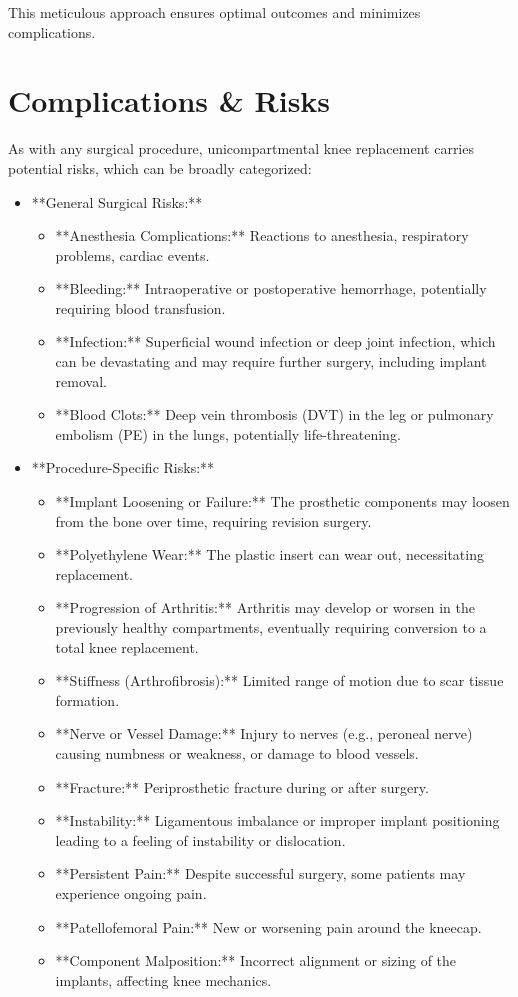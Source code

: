 This meticulous approach ensures optimal outcomes and minimizes complications.

\section*{Complications \& Risks}
As with any surgical procedure, unicompartmental knee replacement carries potential risks, which can be broadly categorized:

\begin{itemize}
  \item **General Surgical Risks:**
    \begin{itemize}
      \item **Anesthesia Complications:** Reactions to anesthesia, respiratory problems, cardiac events.
      \item **Bleeding:** Intraoperative or postoperative hemorrhage, potentially requiring blood transfusion.
      \item **Infection:** Superficial wound infection or deep joint infection, which can be devastating and may require further surgery, including implant removal.
      \item **Blood Clots:** Deep vein thrombosis (DVT) in the leg or pulmonary embolism (PE) in the lungs, potentially life-threatening.
    \end{itemize}
  
  \item **Procedure-Specific Risks:**
    \begin{itemize}
      \item **Implant Loosening or Failure:** The prosthetic components may loosen from the bone over time, requiring revision surgery.
      \item **Polyethylene Wear:** The plastic insert can wear out, necessitating replacement.
      \item **Progression of Arthritis:** Arthritis may develop or worsen in the previously healthy compartments, eventually requiring conversion to a total knee replacement.
      \item **Stiffness (Arthrofibrosis):** Limited range of motion due to scar tissue formation.
      \item **Nerve or Vessel Damage:** Injury to nerves (e.g., peroneal nerve) causing numbness or weakness, or damage to blood vessels.
      \item **Fracture:** Periprosthetic fracture during or after surgery.
      \item **Instability:** Ligamentous imbalance or improper implant positioning leading to a feeling of instability or dislocation.
      \item **Persistent Pain:** Despite successful surgery, some patients may experience ongoing pain.
      \item **Patellofemoral Pain:** New or worsening pain around the kneecap.
      \item **Component Malposition:** Incorrect alignment or sizing of the implants, affecting knee mechanics.
    \end{itemize}
\end{itemize}

